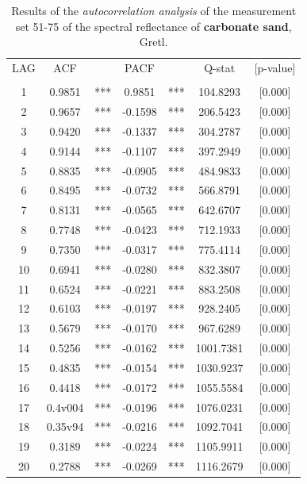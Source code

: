 \documentclass[10pt, a4paper]{article}
\begin{document}
\begin{appendices}
\begin{table}[htbp]
\caption{Results of the \textit{autocorrelation analysis} of the measurement set 51-75 of the spectral reflectance of \textbf{carbonate sand}, Gretl.}
\label{tab:14}
\begin{center}
\begin{tabular}{|c c c c c c c||}
\hline\hline
LAG & ACF & & PACF & & Q-stat & [p-value] \\ \\ \hline\hline
1  & 0.9851 & ***  & 0.9851& ***   & 104.8293 & [0.000]\\ \hline
    2  & 0.9657  &***  &-0.1598  &   ***  &  206.5423  &[0.000]\\ \hline
    3  & 0.9420  &***  &-0.1337  &  ***   &  304.2787  &[0.000]\\ \hline
    4  & 0.9144  &***  &-0.1107  &  ***   &  397.2949  &[0.000]\\ \hline
    5  & 0.8835  &***  &-0.0905  &  ***   &  484.9833  &[0.000]\\ \hline
    6  & 0.8495 & ***  &-0.0732  &  ***   &  566.8791  &[0.000]\\ \hline
    7  & 0.8131 & ***  &-0.0565  &  ***   &  642.6707  &[0.000]\\ \hline
    8  & 0.7748 & ***  &-0.0423  &  ***   &  712.1933  &[0.000]\\ \hline
    9  & 0.7350 & ***  &-0.0317  &  ***   &  775.4114  &[0.000]\\ \hline
   10 &  0.6941&  *** & -0.0280 &  ***   &   832.3807 & [0.000]\\ \hline
   11 &  0.6524 & *** & -0.0221 &  ***   &   883.2508 & [0.000]\\ \hline
   12 &  0.6103 & *** & -0.0197 &  ***   &   928.2405 & [0.000]\\ \hline
   13 &  0.5679 & *** & -0.0170 &  ***   &   967.6289 & [0.000]\\ \hline
   14 &  0.5256 & *** & -0.0162 &  ***   &  1001.7381&  [0.000]\\ \hline
   15 &  0.4835 & *** & -0.0154 &  ***   &  1030.9237 & [0.000]\\ \hline
   16 & 0.4418 & *** & -0.0172  &  ***  &  1055.5584 & [0.000]\\ \hline
   17  & 0.4v004 & *** & -0.0196 &***     &  1076.0231 & [0.000]\\ \hline
   18 & 0.35v94 & *** & -0.0216  & ***   &  1092.7041 & [0.000]\\ \hline
   19 &  0.3189 & *** & -0.0224   & ***  &  1105.9911 & [0.000]\\ \hline
   20 &  0.2788 & *** & -0.0269   & ***  &  1116.2679 & [0.000]\\ \hline
\end{tabular}
\end{center}
\label{fig:5}
\end{table}
\pagebreak


\end{appendices}
\end{document}
